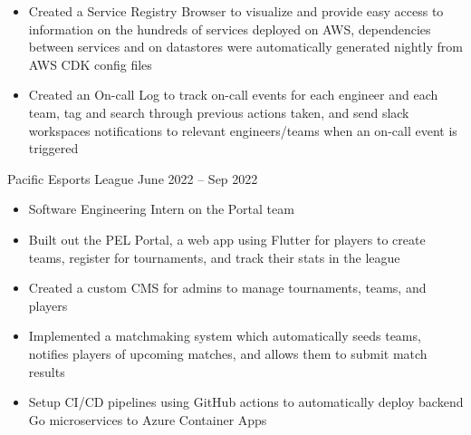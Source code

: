 \documentclass[9pt]{developercv} %
\begin{document}
\begin{entrylist}
{\begin{itemize}[noitemsep,topsep=0pt,parsep=0pt,partopsep=0pt, leftmargin=10pt]
            \item Created a Service Registry Browser to visualize and provide easy access to information on the hundreds of services deployed on AWS, dependencies between services and on datastores were automatically generated nightly from AWS CDK config files
            \item Created an On-call Log to track on-call events for each engineer and each team, tag and search through previous actions taken, and send slack workspaces notifications to relevant engineers/teams when an on-call event is triggered
        \end{itemize}}
	\entry
		{}
		{Pacific Esports League}
		{June 2022 – Sep 2022}
		{\vspace{-10pt}
        \begin{itemize}[noitemsep,topsep=0pt,parsep=0pt,partopsep=0pt, leftmargin=10pt]
            \item Software Engineering Intern on the Portal team
            \item Built out the PEL Portal, a web app using Flutter for players to create teams, register for tournaments, and track their stats in the league
            \item Created a custom CMS for admins to manage tournaments, teams, and players
            \item Implemented a matchmaking system which automatically seeds teams, notifies players of upcoming matches, and allows them to submit match results
            \item Setup CI/CD pipelines using GitHub actions to automatically deploy backend Go microservices to Azure Container Apps
        \end{itemize}}
\end{entrylist}
\end{document}
